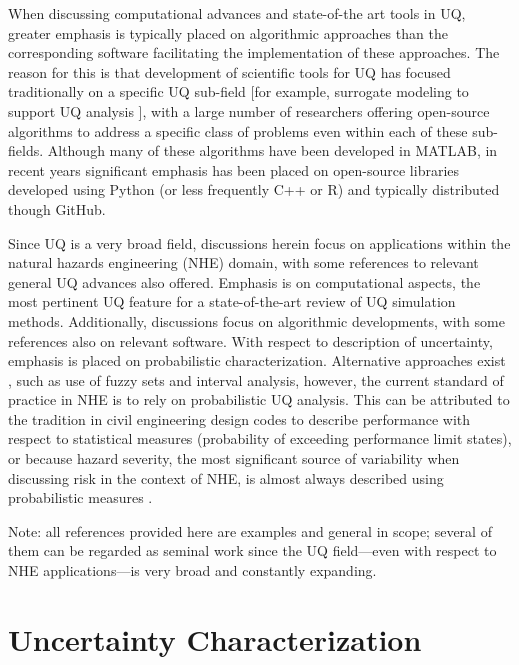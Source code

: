When discussing computational advances and state-of-the art tools in UQ, greater emphasis is typically placed on algorithmic approaches than the corresponding software facilitating the implementation of these approaches. The reason for this is that development of scientific tools for UQ has focused traditionally on a specific UQ sub-field [for example, surrogate modeling to support UQ analysis \citep{lophaven2002dacea, gorissen2010surrogate}], with a large number of researchers \citep[e.g.,][]{bect2017bayesian, clement2018methods} offering open-source algorithms to address a specific class of problems even within each of these sub-fields. Although many of these algorithms have been developed in MATLAB, in recent years significant emphasis has been placed on open-source libraries developed using Python (or less frequently C++ or R) and typically distributed though GitHub.    

Since UQ is a very broad field, discussions herein focus on applications within the natural hazards engineering (NHE) domain, with some references to relevant general UQ advances also offered. Emphasis is on computational aspects, the most pertinent UQ feature for a state-of-the-art review of UQ simulation methods. Additionally, discussions focus on algorithmic developments, with some references also on relevant software. With respect to description of uncertainty, emphasis is placed on probabilistic characterization. Alternative approaches exist \citep{beer2013imprecise}, such as use of fuzzy sets and interval analysis, however, the current standard of practice in NHE is to rely on probabilistic UQ analysis. This can be attributed to the tradition in civil engineering design codes to describe performance with respect to statistical measures (probability of exceeding performance limit states), or because hazard severity, the most significant source of variability when discussing risk in the context of NHE, is almost always described using probabilistic measures \citep{mcguire2004seismic, resio2007white}. 

Note: all references provided here are examples and general in scope; several of them can be regarded as seminal work since the UQ field---even with respect to NHE applications---is very broad and constantly expanding.    

\section{Uncertainty Characterization}
\label{sec:uq_characterization}

